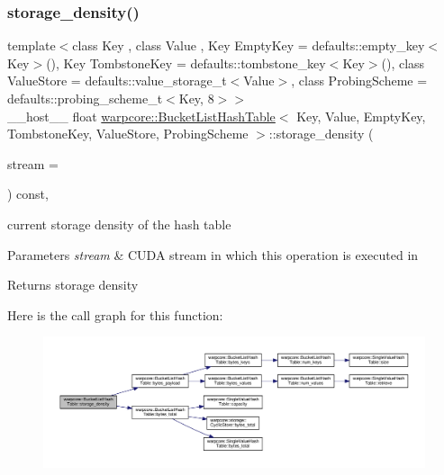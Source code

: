 \subsubsection{\texorpdfstring{storage\+\_\+density()}{storage\_density()}}
{\footnotesize\ttfamily template$<$class Key , class Value , Key Empty\+Key = defaults\+::empty\+\_\+key$<$\+Key$>$(), Key Tombstone\+Key = defaults\+::tombstone\+\_\+key$<$\+Key$>$(), class Value\+Store  = defaults\+::value\+\_\+storage\+\_\+t$<$\+Value$>$, class Probing\+Scheme  = defaults\+::probing\+\_\+scheme\+\_\+t$<$\+Key, 8$>$$>$ \\
\+\_\+\+\_\+host\+\_\+\+\_\+ float \hyperlink{classwarpcore_1_1BucketListHashTable}{warpcore\+::\+Bucket\+List\+Hash\+Table}$<$ Key, Value, Empty\+Key, Tombstone\+Key, Value\+Store, Probing\+Scheme $>$\+::storage\+\_\+density (\begin{DoxyParamCaption}\item[{const cuda\+Stream\+\_\+t}]{stream = {} }\end{DoxyParamCaption}) const\hspace{0.3cm}{\ttfamily [inline]}, {\ttfamily [noexcept]}}



current storage density of the hash table 


\begin{DoxyParams}{Parameters}
{\em stream} & C\+U\+DA stream in which this operation is executed in \\
\hline
\end{DoxyParams}
\begin{DoxyReturn}{Returns}
storage density 
\end{DoxyReturn}
Here is the call graph for this function\+:
\nopagebreak
\begin{figure}[H]
\begin{center}
\leavevmode
\includegraphics[width=350pt]{classwarpcore_1_1BucketListHashTable_a7c08b3793ff8eaac76009fdf8299f6b6_cgraph}
\end{center}
\end{figure}
\mbox{\label{classwarpcore_1_1BucketListHashTable_a985f5a5fc540a0a157a7508f8b326a50}} 
